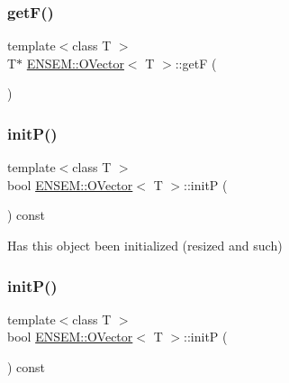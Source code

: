 \mbox{\label{classENSEM_1_1OVector_a73065fd6ed2149ce8699996d691c4c42}} 
\subsubsection{\texorpdfstring{getF()}{getF()}\hspace{0.1cm}{\footnotesize\ttfamily [6/6]}}
{\footnotesize\ttfamily template$<$class T $>$ \\
T$\ast$ \mbox{\hyperlink{classENSEM_1_1OVector}{E\+N\+S\+E\+M\+::\+O\+Vector}}$<$ T $>$\+::getF (\begin{DoxyParamCaption}{ }\end{DoxyParamCaption})\hspace{0.3cm}{\ttfamily [inline]}}

\mbox{\label{classENSEM_1_1OVector_ae1c9e62826d9b61edc7f85d8f8aedf79}} 
\subsubsection{\texorpdfstring{initP()}{initP()}\hspace{0.1cm}{\footnotesize\ttfamily [1/3]}}
{\footnotesize\ttfamily template$<$class T $>$ \\
bool \mbox{\hyperlink{classENSEM_1_1OVector}{E\+N\+S\+E\+M\+::\+O\+Vector}}$<$ T $>$\+::initP (\begin{DoxyParamCaption}{ }\end{DoxyParamCaption}) const\hspace{0.3cm}{\ttfamily [inline]}}



Has this object been initialized (resized and such) 

\mbox{\label{classENSEM_1_1OVector_ae1c9e62826d9b61edc7f85d8f8aedf79}} 
\subsubsection{\texorpdfstring{initP()}{initP()}\hspace{0.1cm}{\footnotesize\ttfamily [2/3]}}
{\footnotesize\ttfamily template$<$class T $>$ \\
bool \mbox{\hyperlink{classENSEM_1_1OVector}{E\+N\+S\+E\+M\+::\+O\+Vector}}$<$ T $>$\+::initP (\begin{DoxyParamCaption}{ }\end{DoxyParamCaption}) const\hspace{0.3cm}{\ttfamily [inline]}}



